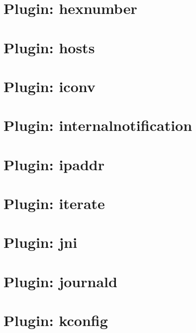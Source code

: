 \let\mypdfximage\pdfximage\def\pdfximage{\immediate\mypdfximage}\documentclass[twoside]{book}
\newcommand{\+}{\discretionary{\mbox{\scriptsize$\hookleftarrow$}}{}{}}
\begin{document}
\chapter{Plugin\+: hexnumber}
\label{md_src_plugins_hexnumber_README}

\chapter{Plugin\+: hosts}
\label{md_src_plugins_hosts_README}

\chapter{Plugin\+: iconv}
\label{md_src_plugins_iconv_README}

\chapter{Plugin\+: internalnotification}
\label{md_src_plugins_internalnotification_README}

\chapter{Plugin\+: ipaddr}
\label{md_src_plugins_ipaddr_README}

\chapter{Plugin\+: iterate}
\label{md_src_plugins_iterate_README}

\chapter{Plugin\+: jni}
\label{md_src_plugins_jni_README}

\chapter{Plugin\+: journald}
\label{md_src_plugins_journald_README}

\chapter{Plugin\+: kconfig}
\label{md_src_plugins_kconfig_README}

\end{document}
